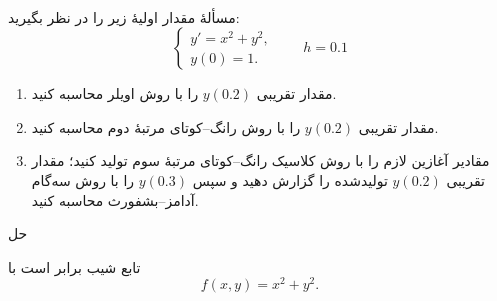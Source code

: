 \\
مسألهٔ مقدار اولیهٔ زیر را در نظر بگیرید:
\[
 \begin{cases}
 y'=x^2+y^2,\\
 y(0)=1.
 \end{cases}
 \qquad h=0.1
\]
\begin{enumerate}
 \item مقدار تقریبی \(y(0.2)\) را با روش اویلر محاسبه کنید.
 \item مقدار تقریبی \(y(0.2)\) را با روش رانگ--کوتای مرتبهٔ دوم محاسبه کنید.
 \item مقادیر آغازین لازم را با روش کلاسیک رانگ--کوتای مرتبهٔ سوم تولید کنید؛
 مقدار تقریبی \(y(0.2)\) تولیدشده را گزارش دهید و سپس \(y(0.3)\) را با روش سه‌گام آدامز--بشفورث محاسبه کنید.
\end{enumerate}

\begingroup\color{blue}
حل

تابع شیب برابر است با
\[
 f(x,y)=x^2+y^2.
\]

